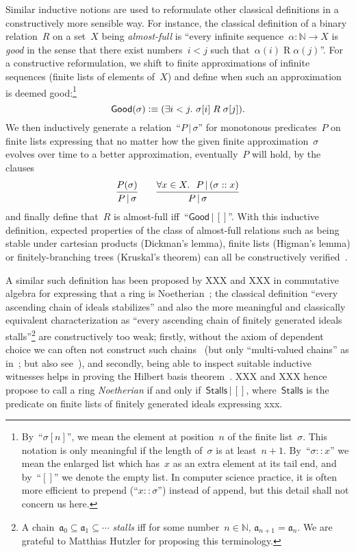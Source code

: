 \documentclass[oneside,reqno]{amsart}
\theoremstyle{definition}
\theoremstyle{plain}
\theoremstyle{remark}
\newcommand{\aaa}{\mathfrak{a}}
\newcommand{\NN}{\mathbb{N}}
\newcommand{\defeqv}{\vcentcolon\equiv}
\renewcommand{\_}{\mathpunct{.}\,}
\newcommand{\?}{\,{:}\,}
\begin{document}
Similar inductive notions are used to reformulate other classical definitions
in a constructively more sensible way. For instance, the classical definition
of a binary relation~$R$ on a set~$X$ being \emph{almost-full} is ``every
infinite sequence~$\alpha : \NN \to X$ is \emph{good} in the sense that there
exist numbers~$i < j$ such that~$\alpha(i) \mathrel{R} \alpha(j)$''.
For a constructive reformulation, we shift to finite approximations of
infinite sequences (finite lists of elements of~$X$) and define when such an
approximation is deemed good:\footnote{By~``$\sigma[n]$'', we mean the element
at position~$n$ of the finite list~$\sigma$. This notation is only meaningful
if the length of~$\sigma$ is at least~$n+1$. By~``$\sigma :: x$'' we mean the
enlarged list which has~$x$ as an extra element at its tail end, and by~``$[]$'' we
denote the empty list. In computer science practice, it is often more efficient
to prepend (``$x :: \sigma$'') instead of append, but this detail shall not
concern us here.}
\[ \mathsf{Good}(\sigma) \defeqv (\exists i<j\_ \sigma[i] \mathrel{R} \sigma[j]). \]
We then inductively generate a relation~``$P \,|\, \sigma$'' for monotonous
predicates~$P$ on finite lists expressing that no matter how the given finite
approximation~$\sigma$ evolves over time to a better approximation,
eventually~$P$ will hold, by the clauses
\[
  \infer{P \,|\, \sigma}{P(\sigma)}
  \qquad
  \infer{P \,|\, \sigma}{\forall x \in X\_\ P \,|\, (\sigma :: x)}
\]
and finally define that~$R$ is almost-full iff~``$\mathsf{Good} \,|\, []$''.
With this inductive definition, expected properties of the class of almost-full
relations such as being stable under cartesian products (Dickman's lemma),
finite lists (Higman's lemma) or finitely-branching trees (Kruskal's theorem)
can all be constructively verified~\cite{xxx}.

A similar such definition has been proposed by XXX and XXX in commutative
algebra for expressing that a ring is Noetherian~\cite{xxx}; the classical
definition ``every ascending chain of ideals stabilizes'' and also the more
meaningful and classically equivalent characterization as ``every ascending
chain of finitely generated ideals stalls''\footnote{A chain~$\aaa_0 \subseteq
\aaa_1 \subseteq \cdots$ \emph{stalls} iff for some number~$n \in \NN$,
$\aaa_{n+1} = \aaa_n$. We are grateful to Matthias Hutzler for proposing this
terminology.} are constructively too weak; firstly, without the axiom of
dependent choice we can often not construct such chains~\cite{richman:xxx} (but only
``multi-valued chains'' as in~\cite[Section~3.9]{blechschmidt:phd}; but also
see~\cite{richman:xxx}), and secondly, being able to inspect suitable inductive
witnesses helps in proving the Hilbert basis theorem~\cite{xxx}. XXX and XXX
hence propose to call a ring \emph{Noetherian} if and only if~$\mathsf{Stalls}
\,|\, []$, where~$\mathsf{Stalls}$ is the predicate on finite lists of finitely
generated ideals expressing xxx.
\end{document}
